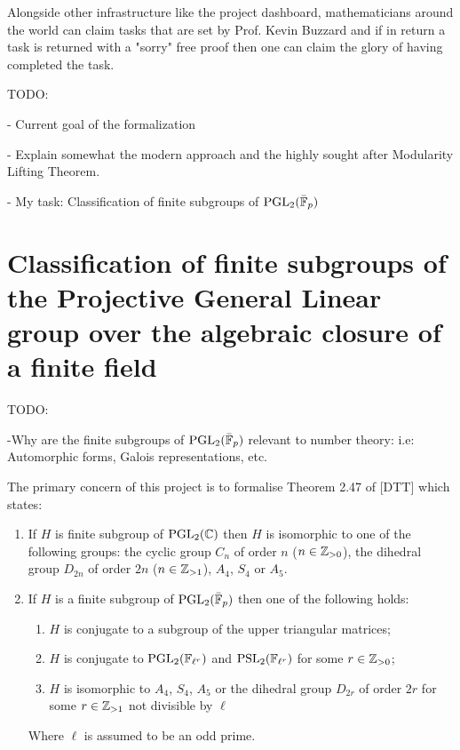Alongside other infrastructure like the project dashboard, mathematicians around the world can claim tasks that are set by Prof. Kevin Buzzard and if in return a task is returned with a "sorry" free proof then one can claim the glory of having completed the task.

TODO:

- Current goal of the formalization

- Explain somewhat the modern approach and the highly sought after Modularity Lifting Theorem.

- My task: Classification of finite subgroups of $\operatorname{PGL}_2(\bar{\mathbb{F}}_p)$



\section{Classification of finite subgroups of the Projective General Linear group over the algebraic closure of a finite field}

TODO:

-Why are the finite subgroups of  $\operatorname{PGL}_2(\bar{\mathbb{F}}_p)$ relevant to number theory: i.e: Automorphic forms, Galois representations, etc.


The primary concern of this project is to formalise Theorem 2.47 of [DTT] which states:

\begin{enumerate}
    \item If $H$ is finite subgroup of $\operatorname{PGL}_2(\mathbb{C})$ then $H$ is isomorphic to one of the following groups: the cyclic group $C_n$ of order $n$ ($n \in \mathbb{Z}_{>0}$), the dihedral group $D_{2n}$ of order $2n$ ($n \in \mathbb{Z}_{>1}$), $A_4$, $S_4$ or $A_5$.
\item If $H$ is a finite subgroup of $\operatorname{PGL}_2(\bar{\mathbb{F}}_p)$ then one of the following holds:
\begin{enumerate}
    \item $H$ is conjugate to a subgroup of the upper triangular matrices;
    \item $H$ is conjugate to $\operatorname{PGL}_2(\mathbb{F}_{\ell^r})$ and $\operatorname{PSL}_2(\mathbb{F}_{\ell^{r}})$ for some $r \in \mathbb{Z}_{>0}$;
    \item $H$ is isomorphic to $A_4$, $S_4$, $A_5$ or the dihedral group $D_{2r}$ of order $2r$ for some $r \in \mathbb{Z}_{>1}$ not divisible by $\ell$

\end{enumerate}
    Where $\ell$ is assumed to be an odd prime.
\end{enumerate}


